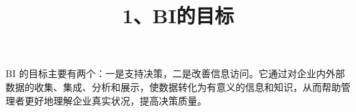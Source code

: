 \documentclass[UTF8,zihao=-4]{ctexart}
\begin{document}
\title{1、BI的目标}
\author{}
\date{}
\maketitle

BI 的目标主要有两个：一是支持决策，二是改善信息访问。它通过对企业内外部数据的收集、集成、分析和展示，使数据转化为有意义的信息和知识，从而帮助管理者更好地理解企业真实状况，提高决策质量。\par
\end{document}
